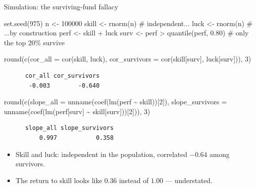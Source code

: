 \documentclass[
  11pt,
  ignorenonframetext,
  aspectratio=169,
]{beamer}
\newenvironment{Shaded}{\begin{snugshade}}{\end{snugshade}}
\newcommand{\AttributeTok}[1]{\textcolor[rgb]{0.40,0.45,0.13}{#1}}
\newcommand{\CommentTok}[1]{\textcolor[rgb]{0.37,0.37,0.37}{#1}}
\newcommand{\DecValTok}[1]{\textcolor[rgb]{0.68,0.00,0.00}{#1}}
\newcommand{\FloatTok}[1]{\textcolor[rgb]{0.68,0.00,0.00}{#1}}
\newcommand{\FunctionTok}[1]{\textcolor[rgb]{0.28,0.35,0.67}{#1}}
\newcommand{\NormalTok}[1]{\textcolor[rgb]{0.00,0.23,0.31}{#1}}
\newcommand{\OtherTok}[1]{\textcolor[rgb]{0.00,0.23,0.31}{#1}}
\newcommand{\SpecialCharTok}[1]{\textcolor[rgb]{0.37,0.37,0.37}{#1}}
\providecommand{\tightlist}{%
  \setlength{\itemsep}{0pt}\setlength{\parskip}{0pt}}
\begin{document}
\begin{frame}[fragile]{Simulation: the surviving-fund fallacy}
\protect{}\label{simulation-the-surviving-fund-fallacy}
\begin{Shaded}
\begin{Highlighting}[]
\FunctionTok{set.seed}\NormalTok{(}\DecValTok{975}\NormalTok{)}
\NormalTok{n     }\OtherTok{\textless{}{-}} \DecValTok{100000}
\NormalTok{skill }\OtherTok{\textless{}{-}} \FunctionTok{rnorm}\NormalTok{(n)                       }\CommentTok{\# independent...}
\NormalTok{luck  }\OtherTok{\textless{}{-}} \FunctionTok{rnorm}\NormalTok{(n)                       }\CommentTok{\# ...by construction}
\NormalTok{perf  }\OtherTok{\textless{}{-}}\NormalTok{ skill }\SpecialCharTok{+}\NormalTok{ luck}
\NormalTok{surv  }\OtherTok{\textless{}{-}}\NormalTok{ perf }\SpecialCharTok{\textgreater{}} \FunctionTok{quantile}\NormalTok{(perf, }\FloatTok{0.80}\NormalTok{)    }\CommentTok{\# only the top 20\% survive}

\FunctionTok{round}\NormalTok{(}\FunctionTok{c}\NormalTok{(}\AttributeTok{cor\_all       =} \FunctionTok{cor}\NormalTok{(skill, luck),}
        \AttributeTok{cor\_survivors =} \FunctionTok{cor}\NormalTok{(skill[surv], luck[surv])), }\DecValTok{3}\NormalTok{)}
\end{Highlighting}
\end{Shaded}

\begin{verbatim}
      cor_all cor_survivors 
       -0.003        -0.640 
\end{verbatim}

\vspace{-0.5em}

\begin{Shaded}
\begin{Highlighting}[]
\FunctionTok{round}\NormalTok{(}\FunctionTok{c}\NormalTok{(}\AttributeTok{slope\_all       =} \FunctionTok{unname}\NormalTok{(}\FunctionTok{coef}\NormalTok{(}\FunctionTok{lm}\NormalTok{(perf }\SpecialCharTok{\textasciitilde{}}\NormalTok{ skill))[}\DecValTok{2}\NormalTok{]),}
        \AttributeTok{slope\_survivors =} \FunctionTok{unname}\NormalTok{(}\FunctionTok{coef}\NormalTok{(}\FunctionTok{lm}\NormalTok{(perf[surv] }\SpecialCharTok{\textasciitilde{}}\NormalTok{ skill[surv]))[}\DecValTok{2}\NormalTok{])), }\DecValTok{3}\NormalTok{)}
\end{Highlighting}
\end{Shaded}

\begin{verbatim}
      slope_all slope_survivors 
          0.997           0.358 
\end{verbatim}

\begin{itemize}
\tightlist
\item
  Skill and luck: independent in the population, correlated \(-0.64\)
  among survivors.
\item
  The return to skill looks like \(0.36\) instead of \(1.00\) ---
  understated.
\end{itemize}
\end{frame}
\end{document}
